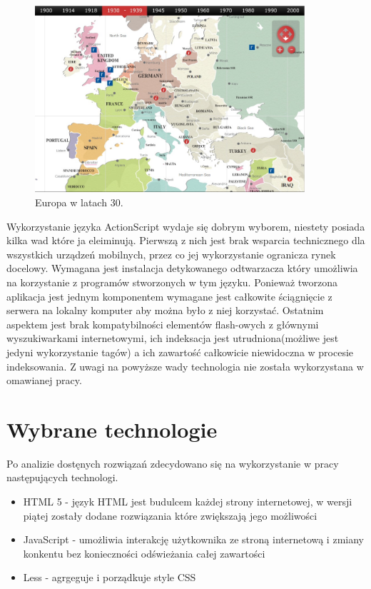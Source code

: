 \begin{figure}[H]
  \centering
    \includegraphics[width=100mm]{ge/archives.jpg}
  \caption{Europa w latach 30.}
  \label{fig:flasheurope}
\end{figure}


Wykorzystanie języka ActionScript wydaje się dobrym wyborem, niestety posiada kilka wad które ja eleiminują. Pierwszą z nich jest brak wsparcia technicznego dla wszystkich urządzeń mobilnych, przez co jej wykorzystanie ogranicza rynek docelowy.
Wymagana jest instalacja detykowanego odtwarzacza który umożliwia na korzystanie z programów stworzonych w tym języku.
Ponieważ tworzona aplikacja jest jednym komponentem wymagane jest całkowite ściągnięcie z serwera na lokalny komputer aby można było z niej korzystać. Ostatnim aspektem jest brak kompatybilności elementów flash-owych z głównymi wyszukiwarkami internetowymi, ich indeksacja jest utrudniona(możliwe jest jedyni wykorzystanie tagów) a ich zawartość całkowicie niewidoczna w procesie indeksowania. Z uwagi na powyższe wady technologia nie została wykorzystana w omawianej pracy.

\section{Wybrane technologie}
\label{sec:technologie}

Po analizie dostęnych rozwiązań zdecydowano się na wykorzystanie w pracy następujących technologi.
\begin{itemize}

\item
HTML 5 - język HTML jest budulcem każdej strony internetowej, w wersji piątej zostały dodane rozwiązania które zwiększają jego możliwości

\item
JavaScript - umożliwia interakcję użytkownika ze stroną internetową  i zmiany konkentu bez konieczności odświeżania całej zawartości

\item
Less - agrgeguje i porządkuje style CSS

\end{itemize}
